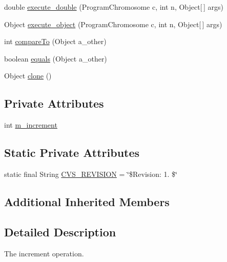 \begin{DoxyCompactItemize}
\item 
double \hyperlink{classorg_1_1jgap_1_1gp_1_1function_1_1_increment_a4f8f08d89ab5e987cebbe2fe61d79c47}{execute\-\_\-double} (Program\-Chromosome c, int n, Object\mbox{[}$\,$\mbox{]} args)
\item 
Object \hyperlink{classorg_1_1jgap_1_1gp_1_1function_1_1_increment_a73502b936f142b551378b45c665246b5}{execute\-\_\-object} (Program\-Chromosome c, int n, Object\mbox{[}$\,$\mbox{]} args)
\item 
int \hyperlink{classorg_1_1jgap_1_1gp_1_1function_1_1_increment_a57cdfea053a56e217f1f78aeba06b09c}{compare\-To} (Object a\-\_\-other)
\item 
boolean \hyperlink{classorg_1_1jgap_1_1gp_1_1function_1_1_increment_a3a7aea332963accd897016434175da21}{equals} (Object a\-\_\-other)
\item 
Object \hyperlink{classorg_1_1jgap_1_1gp_1_1function_1_1_increment_a50a82ab2d4c8f4bd7fdfd3f6839f37b1}{clone} ()
\end{DoxyCompactItemize}
\subsection*{Private Attributes}
\begin{DoxyCompactItemize}
\item 
int \hyperlink{classorg_1_1jgap_1_1gp_1_1function_1_1_increment_ae6c774213dc5c66a1c6335b8815cfd2d}{m\-\_\-increment}
\end{DoxyCompactItemize}
\subsection*{Static Private Attributes}
\begin{DoxyCompactItemize}
\item 
static final String \hyperlink{classorg_1_1jgap_1_1gp_1_1function_1_1_increment_af2a26cc6611b9772fa2a98c939a5b865}{C\-V\-S\-\_\-\-R\-E\-V\-I\-S\-I\-O\-N} = \char`\"{}\$Revision\-: 1. \$\char`\"{}
\end{DoxyCompactItemize}
\subsection*{Additional Inherited Members}


\subsection{Detailed Description}
The increment operation.

